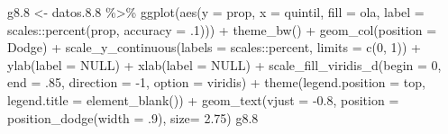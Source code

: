 \documentclass[
  12pt,
]{book}
\newenvironment{Shaded}{\begin{snugshade}}{\end{snugshade}}
\newcommand{\AttributeTok}[1]{\textcolor[rgb]{0.77,0.63,0.00}{#1}}
\newcommand{\ConstantTok}[1]{\textcolor[rgb]{0.00,0.00,0.00}{#1}}
\newcommand{\DecValTok}[1]{\textcolor[rgb]{0.00,0.00,0.81}{#1}}
\newcommand{\FloatTok}[1]{\textcolor[rgb]{0.00,0.00,0.81}{#1}}
\newcommand{\FunctionTok}[1]{\textcolor[rgb]{0.00,0.00,0.00}{#1}}
\newcommand{\NormalTok}[1]{#1}
\newcommand{\OtherTok}[1]{\textcolor[rgb]{0.56,0.35,0.01}{#1}}
\newcommand{\SpecialCharTok}[1]{\textcolor[rgb]{0.00,0.00,0.00}{#1}}
\newcommand{\StringTok}[1]{\textcolor[rgb]{0.31,0.60,0.02}{#1}}
\begin{document}
\begin{Shaded}
\begin{Highlighting}[]
\NormalTok{g8}\FloatTok{.8} \OtherTok{\textless{}{-}}\NormalTok{ datos.}\FloatTok{8.8} \SpecialCharTok{\%\textgreater{}\%} 
  \FunctionTok{ggplot}\NormalTok{(}\FunctionTok{aes}\NormalTok{(}\AttributeTok{y =}\NormalTok{ prop, }\AttributeTok{x =}\NormalTok{ quintil, }\AttributeTok{fill =}\NormalTok{ ola, }
             \AttributeTok{label =}\NormalTok{ scales}\SpecialCharTok{::}\FunctionTok{percent}\NormalTok{(prop, }\AttributeTok{accuracy =}\NormalTok{ .}\DecValTok{1}\NormalTok{))) }\SpecialCharTok{+} 
  \FunctionTok{theme\_bw}\NormalTok{() }\SpecialCharTok{+} 
  \FunctionTok{geom\_col}\NormalTok{(}\AttributeTok{position =} \StringTok{\textquotesingle{}Dodge\textquotesingle{}}\NormalTok{) }\SpecialCharTok{+}
  \FunctionTok{scale\_y\_continuous}\NormalTok{(}\AttributeTok{labels =}\NormalTok{ scales}\SpecialCharTok{::}\NormalTok{percent,}
                     \AttributeTok{limits =} \FunctionTok{c}\NormalTok{(}\DecValTok{0}\NormalTok{, }\DecValTok{1}\NormalTok{)) }\SpecialCharTok{+}
  \FunctionTok{ylab}\NormalTok{(}\AttributeTok{label =} \ConstantTok{NULL}\NormalTok{) }\SpecialCharTok{+}
  \FunctionTok{xlab}\NormalTok{(}\AttributeTok{label =} \ConstantTok{NULL}\NormalTok{) }\SpecialCharTok{+}
  \FunctionTok{scale\_fill\_viridis\_d}\NormalTok{(}\AttributeTok{begin =} \DecValTok{0}\NormalTok{, }\AttributeTok{end =}\NormalTok{ .}\DecValTok{85}\NormalTok{, }\AttributeTok{direction =} \SpecialCharTok{{-}}\DecValTok{1}\NormalTok{, }\AttributeTok{option =} \StringTok{\textquotesingle{}viridis\textquotesingle{}}\NormalTok{) }\SpecialCharTok{+}
  \FunctionTok{theme}\NormalTok{(}\AttributeTok{legend.position =} \StringTok{\textquotesingle{}top\textquotesingle{}}\NormalTok{,}
        \AttributeTok{legend.title =} \FunctionTok{element\_blank}\NormalTok{()) }\SpecialCharTok{+}
  \FunctionTok{geom\_text}\NormalTok{(}\AttributeTok{vjust =} \SpecialCharTok{{-}}\FloatTok{0.8}\NormalTok{,}
            \AttributeTok{position =} \FunctionTok{position\_dodge}\NormalTok{(}\AttributeTok{width =}\NormalTok{ .}\DecValTok{9}\NormalTok{),}
            \AttributeTok{size=} \FloatTok{2.75}\NormalTok{)}
\NormalTok{g8}\FloatTok{.8}
\end{Highlighting}
\end{Shaded}
\end{document}
